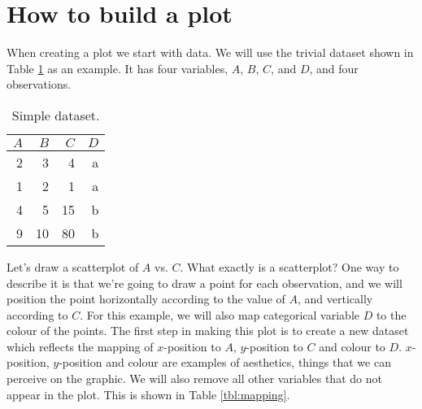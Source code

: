 % 
% 

\section{How to build a plot}\label{sec:how_to_build_a_plot}

When creating a plot we start with data.  We will use the trivial dataset shown in Table \ref{tbl:simple} as an example.  It has four variables, $A$, $B$, $C$, and $D$, and four observations.

\begin{table}[ht]
	\begin{center}
	\begin{tabular}{r|r|r|r}
		$A$ & $B$ & $C$ & $D$\\
		\hline
		2 & 3 & 4 & a\\
		1 & 2 & 1 & a \\
		4 & 5 & 15 & b\\
		9 & 10 & 80 & b
	\end{tabular}
	\end{center}
	\caption{Simple dataset.}
	\label{tbl:simple}
\end{table}

Let's draw a scatterplot of $A$ vs. $C$.  What exactly is a scatterplot?  One way to describe it is that we're going to draw a point for each observation, and we will position the point horizontally according to the value of $A$, and vertically according to $C$.  For this example, we will also map categorical variable $D$ to the colour of the points.  The first step in making this plot is to create a new dataset which reflects the mapping of $x$-position to $A$, $y$-position to $C$ and colour to $D$.  $x$-position, $y$-position and colour are examples of aesthetics, things that we can perceive on the graphic. We will also remove all other variables that do not appear in the plot.  This is shown in Table \ref{tbl:mapping}.

